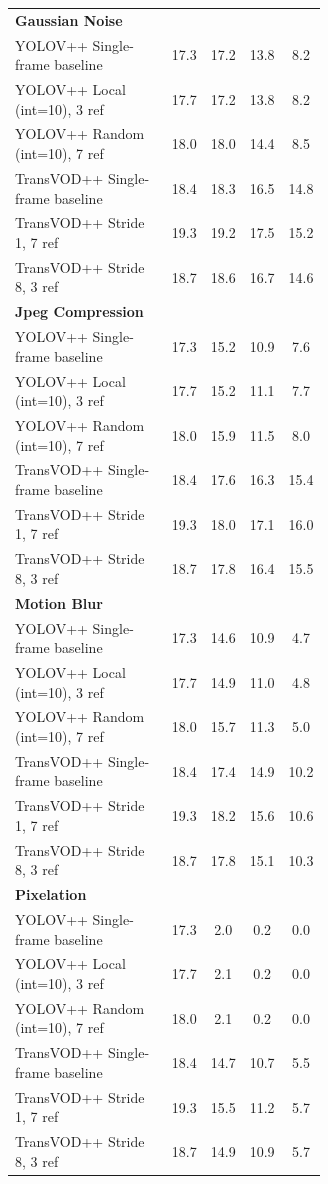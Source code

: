 \documentclass[final,twoside]{vutinfth}
\begin{document}
\begin{table}[t]
\begin{tabular}{p{0.62\linewidth}cccc}
\multicolumn{5}{l}{\textbf{Gaussian Noise}} \\
YOLOV++ Single-frame baseline & 17.3 & 17.2 & 13.8 & 8.2 \\
YOLOV++ Local (int=10), 3 ref & 17.7 & 17.2 & 13.8 & 8.2 \\
YOLOV++ Random (int=10), 7 ref & 18.0 & 18.0 & 14.4 & 8.5 \\
TransVOD++ Single-frame baseline & 18.4 & 18.3 & 16.5 & 14.8 \\
TransVOD++ Stride 1, 7 ref & 19.3 & 19.2 & 17.5 & 15.2 \\
TransVOD++ Stride 8, 3 ref & 18.7 & 18.6 & 16.7 & 14.6 \\
\midrule

\multicolumn{5}{l}{\textbf{Jpeg Compression}} \\
YOLOV++ Single-frame baseline & 17.3 & 15.2 & 10.9 & 7.6 \\
YOLOV++ Local (int=10), 3 ref & 17.7 & 15.2 & 11.1 & 7.7 \\
YOLOV++ Random (int=10), 7 ref & 18.0 & 15.9 & 11.5 & 8.0 \\
TransVOD++ Single-frame baseline & 18.4 & 17.6 & 16.3 & 15.4 \\
TransVOD++ Stride 1, 7 ref & 19.3 & 18.0 & 17.1 & 16.0 \\
TransVOD++ Stride 8, 3 ref & 18.7 & 17.8 & 16.4 & 15.5 \\
\midrule

\multicolumn{5}{l}{\textbf{Motion Blur}} \\
YOLOV++ Single-frame baseline & 17.3 & 14.6 & 10.9 & 4.7 \\
YOLOV++ Local (int=10), 3 ref & 17.7 & 14.9 & 11.0 & 4.8 \\
YOLOV++ Random (int=10), 7 ref & 18.0 & 15.7 & 11.3 & 5.0 \\
TransVOD++ Single-frame baseline & 18.4 & 17.4 & 14.9 & 10.2 \\
TransVOD++ Stride 1, 7 ref & 19.3 & 18.2 & 15.6 & 10.6 \\
TransVOD++ Stride 8, 3 ref & 18.7 & 17.8 & 15.1 & 10.3 \\
\midrule

\multicolumn{5}{l}{\textbf{Pixelation}} \\
YOLOV++ Single-frame baseline & 17.3 & 2.0 & 0.2 & 0.0 \\
YOLOV++ Local (int=10), 3 ref & 17.7 & 2.1 & 0.2 & 0.0 \\
YOLOV++ Random (int=10), 7 ref & 18.0 & 2.1 & 0.2 & 0.0 \\
TransVOD++ Single-frame baseline & 18.4 & 14.7 & 10.7 & 5.5 \\
TransVOD++ Stride 1, 7 ref & 19.3 & 15.5 & 11.2 & 5.7 \\
TransVOD++ Stride 8, 3 ref & 18.7 & 14.9 & 10.9 & 5.7 \\
\bottomrule
\end{tabular}


\end{table}
\end{document}
